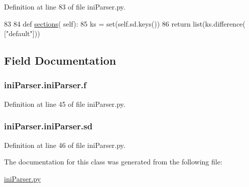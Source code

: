 Definition at line 83 of file ini\-Parser.\-py.


\begin{DoxyCode}
83 
84     \textcolor{keyword}{def }\hyperlink{classiniParser_1_1iniParser_a963ec8890b89b871fa5d660c7bb1a7d5}{sections}( self):
85         ks = set(self.sd.keys())
86         \textcolor{keywordflow}{return} list(ks.difference( [\textcolor{stringliteral}{"default"}]))

\end{DoxyCode}


\subsection{Field Documentation}
\hypertarget{classiniParser_1_1iniParser_a108a10ca051d71b97a1328449dc5ea9f}{
\subsubsection[{f}]{\setlength{\rightskip}{0pt plus 5cm}ini\-Parser.\-ini\-Parser.\-f}}\label{classiniParser_1_1iniParser_a108a10ca051d71b97a1328449dc5ea9f}


Definition at line 45 of file ini\-Parser.\-py.

\hypertarget{classiniParser_1_1iniParser_a8edc5822fa3e8bf757cb4e18852aade0}{
\subsubsection[{sd}]{\setlength{\rightskip}{0pt plus 5cm}ini\-Parser.\-ini\-Parser.\-sd}}\label{classiniParser_1_1iniParser_a8edc5822fa3e8bf757cb4e18852aade0}


Definition at line 46 of file ini\-Parser.\-py.



The documentation for this class was generated from the following file\-:\begin{DoxyCompactItemize}
\item 
\hyperlink{iniParser_8py}{ini\-Parser.\-py}\end{DoxyCompactItemize}
